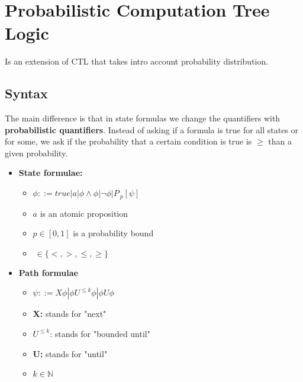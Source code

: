 
\section{Probabilistic Computation Tree Logic}
Is an extension of CTL that takes intro account probability distribution.

\subsection{Syntax}
The main difference is that in state formulas we change the quantifiers with \textbf{probabilistic quantifiers}. Instead of asking if a formula is true for all states or for some, we ask if the probability that a certain condition is true is $\geq$ than a given probability.
\begin{itemize}
    \item \textbf{State formulae:}
        \begin{itemize}
            \item $\phi ::= true | a | \phi \land \phi | \lnot \phi | P_{~p} [\psi]$
            \item $a$ is an atomic proposition
            \item $p \in [0,1]$ is a probability bound
            \item $~ \in \{<, >, \leq, \geq \}$
        \end{itemize}
    \item \textbf{Path formulae}
        \begin{itemize}
            \item $\psi ::= X \phi | \phi U^{\leq k} \phi | \phi U \phi$
            \item \textbf{X:} stands for "next"
            \item $U^{\leq k}$: stands for "bounded until"
            \item \textbf{U:} stands for "until"
            \item $k \in \mathbb{N}$
        \end{itemize}
\end{itemize}
